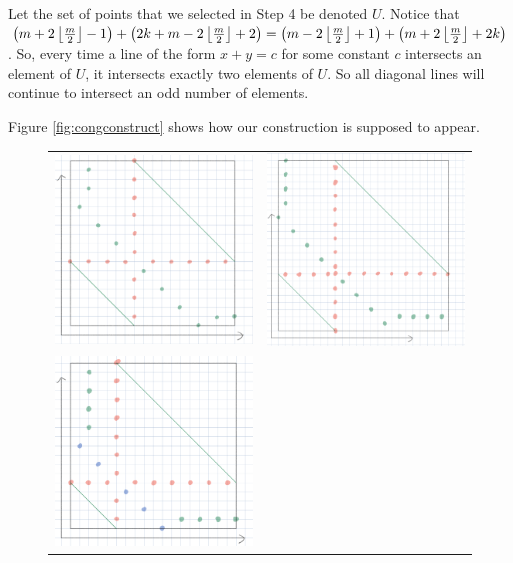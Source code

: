 \documentclass[10pt]{../usamts}
\begin{document}
\begin{solution}
\begin{enumerate}
    Let the set of points that we selected in Step 4 be denoted $U$. Notice that $\left(  m+2\left\lfloor \frac{m}{2} \right\rfloor-1 \right)+\left( 2k + m-2\left\lfloor \frac{m}{2} \right\rfloor+2 \right) = \left( m-2\left\lfloor \frac{m}{2} \right\rfloor+1 \right)+\left( m+2\left\lfloor \frac{m}{2} \right\rfloor+2k \right)$. So, every time a line of the form $x+y=c$ for some constant $c$ intersects an element of $U$, it intersects exactly two elements of $U$. So all diagonal lines will continue to intersect an odd number of elements.
\end{enumerate}

Figure \ref{fig:congconstruct} shows how our construction is supposed to appear.

\begin{figure}[htbp]
    \begin{tabular}{c c}
    \includegraphics[width=7cm]{round2/p5construct/construct_8_12.png}&
    \includegraphics[width=7cm]{round2/p5construct/construct_9_17.png}\\
    \includegraphics[width=7cm]{round2/p5construct/construct_6_14.png}&

\end{tabular}
\end{figure}
\end{solution}
\end{document}
